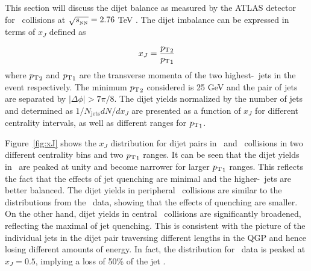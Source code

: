 
This section will discuss the dijet balance as measured by the ATLAS detector for \pbpb\ collisions at $\mbox{$\sqrt{s_{_\text{NN}}}$} = 2.76$ TeV \cite{Aaboud:2017eww}.
The dijet imbalance can be expressed in terms of $x_J$ defined as

\begin{align}
x_J =  \frac{\mbox{$p_{\mathrm{T}}$}_2}{\mbox{$p_{\mathrm{T}}$}_1}
\end{align}
where $\mbox{$p_{\mathrm{T}}$}_2$ and $\mbox{$p_{\mathrm{T}}$}_1$ are the transverse momenta of the two highest-\pt\ jets in the event respectively.
The minimum $\mbox{$p_{\mathrm{T}}$}_2$ considered is 25 GeV and the pair of jets are separated by $|\Delta\phi| > 7\pi/8$.
The dijet yields normalized by the number of jets and determined as $1/N_\mathrm{jets} dN/dx_J$ are presented as a function of $x_J$ for different centrality intervals, as well as different ranges for $\mbox{$p_{\mathrm{T}}$}_1$.

Figure~\ref{fig:xJ} shows the $x_J$ distribution for dijet pairs in \pp\ and \pbpb\ collisions in two different centrality bins and two $\mbox{$p_{\mathrm{T}}$}_1$ ranges.
It can be seen that the dijet yields in \pp\ are peaked at unity and become narrower for larger $\mbox{$p_{\mathrm{T}}$}_1$ ranges.
This reflects the fact that the effects of jet quenching are minimal and the higher-\pt\ jets are better balanced.
The dijet yields in peripheral \pbpb\ collisions are similar to the distributions from the \pp\ data, showing that the effects of quenching are smaller.
On the other hand, dijet yields in central \pbpb\ collisions are significantly broadened, reflecting the maximal  of jet quenching.
This is consistent with the picture of the individual jets in the dijet pair traversing different lengths in the QGP and hence losing different amounts of energy.
In fact, the distribution for \pbpb\ data is peaked at $x_J = 0.5$, implying a loss of 50\% of the jet \pt.

